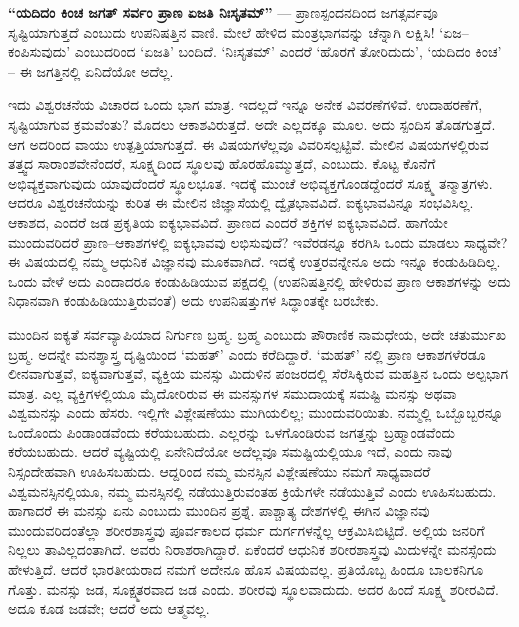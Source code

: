 \textbf{“ಯದಿದಂ ಕಿಂಚ ಜಗತ್​ ಸರ್ವಂ ಪ್ರಾಣ ಏಜತಿ ನಿಃಸೃತಮ್​”} — ಪ್ರಾಣಸ್ಪಂದನದಿಂದ ಜಗತ್ಸರ್ವವೂ ಸೃಷ್ಟಿಯಾಗುತ್ತದೆ ಎಂಬುದು ಉಪನಿಷತ್ತಿನ ವಾಣಿ. ಮೇಲೆ ಹೇಳಿದ ಮಂತ್ರಭಾಗವನ್ನು ಚೆನ್ನಾಗಿ ಲಕ್ಷಿಸಿ! ‘ಏಜ–ಕಂಪಿಸುವುದು’ ಎಂಬುದರಿಂದ ‘ಏಜತಿ’ ಬಂದಿದೆ. ‘ನಿಃಸೃತಮ್​’ ಎಂದರೆ ‘ಹೊರಗೆ ತೋರಿದುದು’, ‘ಯದಿದಂ ಕಿಂಚ’ – ಈ ಜಗತ್ತಿನಲ್ಲಿ ಏನಿದೆಯೋ ಅದೆಲ್ಲ.

ಇದು ವಿಶ್ವರಚನೆಯ ವಿಚಾರದ ಒಂದು ಭಾಗ ಮಾತ್ರ. ಇದಲ್ಲದೆ ಇನ್ನೂ ಅನೇಕ ವಿವರಣೆಗಳಿವೆ. ಉದಾಹರಣೆಗೆ, ಸೃಷ್ಟಿಯಾಗುವ ಕ್ರಮವೆಂತು? ಮೊದಲು ಆಕಾಶವಿರುತ್ತದೆ. ಅದೇ ಎಲ್ಲದಕ್ಕೂ ಮೂಲ. ಅದು ಸ್ಪಂದಿಸ ತೊಡಗುತ್ತದೆ. ಆಗ ಅದರಿಂದ ವಾಯು ಉತ್ಪತ್ತಿಯಾಗುತ್ತದೆ. ಈ ವಿಷಯಗಳೆಲ್ಲವೂ ವಿವರಿಸಲ್ಪಟ್ಟಿವೆ. ಮೇಲಿನ ವಿಷಯಗಳಲ್ಲಿರುವ ತತ್ತ್ವದ ಸಾರಾಂಶವೇನೆಂದರೆ, ಸೂಕ್ಷ್ಮದಿಂದ ಸ್ಥೂಲವು ಹೊರಹೊಮ್ಮುತ್ತದೆ, ಎಂಬುದು. ಕೊಟ್ಟ ಕೊನೆಗೆ ಅಭಿವ್ಯಕ್ತವಾಗುವುದು ಯಾವುದೆಂದರೆ ಸ್ಥೂಲಭೂತ. ಇದಕ್ಕೆ ಮುಂಚೆ ಅಭಿವ್ಯಕ್ತಗೊಂಡದ್ದೆಂದರೆ ಸೂಕ್ಷ್ಮ ತನ್ಮಾತ್ರಗಳು. ಆದರೂ ವಿಶ್ವರಚನೆಯನ್ನು ಕುರಿತ ಈ ಮೇಲಿನ ಜಿಜ್ಞಾಸೆಯಲ್ಲಿ ದ್ವೈತಭಾವವಿದೆ. ಐಕ್ಯಭಾವವಿನ್ನೂ ಸಂಭವಿಸಿಲ್ಲ. ಆಕಾಶದ, ಎಂದರೆ ಜಡ ಪ್ರಕೃತಿಯ ಐಕ್ಯಭಾವವಿದೆ. ಪ್ರಾಣದ ಎಂದರೆ ಶಕ್ತಿಗಳ ಐಕ್ಯಭಾವವಿದೆ. ಹಾಗೆಯೇ ಮುಂದುವರಿದರೆ ಪ್ರಾಣ–ಆಕಾಶಗಳಲ್ಲಿ ಐಕ್ಯಭಾವವು ಲಭಿಸುವುದೆ? ಇವೆರಡನ್ನೂ ಕರಗಿಸಿ ಒಂದು ಮಾಡಲು ಸಾಧ್ಯವೇ? ಈ ವಿಷಯದಲ್ಲಿ ನಮ್ಮ ಆಧುನಿಕ ವಿಜ್ಞಾನವು ಮೂಕವಾಗಿದೆ. ಇದಕ್ಕೆ ಉತ್ತರವನ್ನೇನೂ ಅದು ಇನ್ನೂ ಕಂಡುಹಿಡಿದಿಲ್ಲ. ಒಂದು ವೇಳೆ ಅದು ಎಂದಾದರೂ ಕಂಡುಹಿಡಿಯುವ ಪಕ್ಷದಲ್ಲಿ (ಉಪನಿಷತ್ತಿನಲ್ಲಿ ಹೇಳಿರುವ ಪ್ರಾಣ ಆಕಾಶಗಳನ್ನು ಅದು ನಿಧಾನವಾಗಿ ಕಂಡುಹಿಡಿಯುತ್ತಿರುವಂತೆ) ಅದು ಉಪನಿಷತ್ತುಗಳ ಸಿದ್ಧಾಂತಕ್ಕೇ ಬರಬೇಕು.

ಮುಂದಿನ ಐಕ್ಯತೆ ಸರ್ವವ್ಯಾಪಿಯಾದ ನಿರ್ಗುಣ ಬ್ರಹ್ಮ. ಬ್ರಹ್ಮ ಎಂಬುದು ಪೌರಾಣಿಕ ನಾಮಧೇಯ, ಅದೇ ಚತುರ್ಮುಖ ಬ್ರಹ್ಮ. ಅದನ್ನೇ ಮನಶ್ಶಾಸ್ತ್ರ ದೃಷ್ಟಿಯಿಂದ ‘ಮಹತ್​’ ಎಂದು ಕರೆದಿದ್ದಾರೆ. ‘ಮಹತ್​’ ನಲ್ಲಿ ಪ್ರಾಣ ಆಕಾಶಗಳೆರಡೂ ಲೀನವಾಗುತ್ತವೆ, ಐಕ್ಯವಾಗುತ್ತವೆ, ವ್ಯಕ್ತಿಯ ಮನಸ್ಸು ಮಿದುಳಿನ ಪಂಜರದಲ್ಲಿ ಸೆರೆಸಿಕ್ಕಿರುವ ಮಹತ್ತಿನ ಒಂದು ಅಲ್ಪಭಾಗ ಮಾತ್ರ. ಎಲ್ಲ ವ್ಯಕ್ತಿಗಳಲ್ಲಿಯೂ ಮೈದೋರಿರುವ ಈ ಮನಸ್ಸುಗಳ ಸಮುದಾಯಕ್ಕೆ ಸಮಷ್ಟಿ ಮನಸ್ಸು ಅಥವಾ ವಿಶ್ವಮನಸ್ಸು ಎಂದು ಹೆಸರು. ಇಲ್ಲಿಗೇ ವಿಶ್ಲೇಷಣೆಯು ಮುಗಿಯಲಿಲ್ಲ; ಮುಂದುವರಿಯಿತು. ನಮ್ಮಲ್ಲಿ ಒಬ್ಬೊಬ್ಬರನ್ನೂ ಒಂದೊಂದು ಪಿಂಡಾಂಡವೆಂದು ಕರೆಯಬಹುದು. ಎಲ್ಲರನ್ನು ಒಳಗೊಂಡಿರುವ ಜಗತ್ತನ್ನು ಬ್ರಹ್ಮಾಂಡವೆಂದು ಕರೆಯಬಹುದು. ಆದರೆ ವ್ಯಷ್ಟಿಯಲ್ಲಿ ಏನೇನಿದೆಯೋ ಅದೆಲ್ಲವೂ ಸಮಷ್ಟಿಯಲ್ಲಿಯೂ ಇದೆ, ಎಂದು ನಾವು ನಿಸ್ಸಂದೇಹವಾಗಿ ಊಹಿಸಬಹುದು. ಆದ್ದರಿಂದ ನಮ್ಮ ಮನಸ್ಸಿನ ವಿಶ್ಲೇಷಣೆಯು ನಮಗೆ ಸಾಧ್ಯವಾದರೆ ವಿಶ್ವಮನಸ್ಸಿನಲ್ಲಿಯೂ, ನಮ್ಮ ಮನಸ್ಸಿನಲ್ಲಿ ನಡೆಯುತ್ತಿರುವಂತಹ ಕ್ರಿಯೆಗಳೇ ನಡೆಯುತ್ತಿವೆ ಎಂದು ಊಹಿಸಬಹುದು. ಹಾಗಾದರೆ ಈ ಮನಸ್ಸು ಏನು ಎಂಬುದು ಮುಂದಿನ ಪ್ರಶ್ನೆ. ಪಾಶ್ಚಾತ್ಯ ದೇಶಗಳಲ್ಲಿ ಈಗಿನ ವಿಜ್ಞಾನವು ಮುಂದುವರಿದಂತೆಲ್ಲಾ ಶರೀರಶಾಸ್ತ್ರವು ಪೂರ್ವಕಾಲದ ಧರ್ಮ ದುರ್ಗಗಳನ್ನೆಲ್ಲ ಆಕ್ರಮಿಸಿಬಿಟ್ಟಿದೆ. ಅಲ್ಲಿಯ ಜನರಿಗೆ ನಿಲ್ಲಲು ತಾವಿಲ್ಲದಂತಾಗಿದೆ. ಅವರು ನಿರಾಶರಾಗಿದ್ದಾರೆ. ಏಕೆಂದರೆ ಆಧುನಿಕ ಶರೀರಶಾಸ್ತ್ರವು ಮಿದುಳನ್ನೇ ಮನಸ್ಸೆಂದು ಹೇಳುತ್ತಿದೆ. ಆದರೆ ಭಾರತೀಯರಾದ ನಮಗೆ ಅದೇನೂ ಹೊಸ ವಿಷಯವಲ್ಲ. ಪ್ರತಿಯೊಬ್ಬ ಹಿಂದೂ ಬಾಲಕನಿಗೂ ಗೊತ್ತು. ಮನಸ್ಸು ಜಡ, ಸೂಕ್ಷ್ಮತರವಾದ ಜಡ ಎಂದು. ಶರೀರವು ಸ್ಥೂಲವಾದುದು. ಅದರ ಹಿಂದೆ ಸೂಕ್ಷ್ಮ ಶರೀರವಿದೆ. ಅದೂ ಕೂಡ ಜಡವೇ; ಆದರೆ ಅದು ಆತ್ಮವಲ್ಲ.

